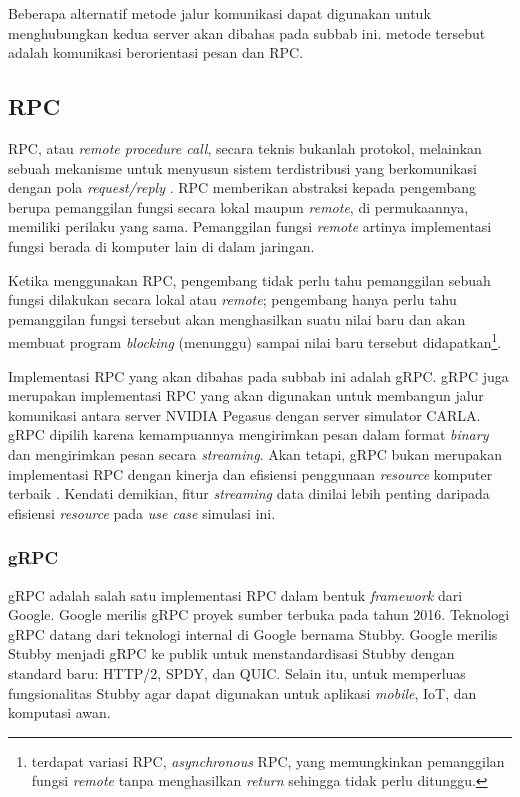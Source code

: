 Beberapa alternatif metode jalur komunikasi dapat digunakan untuk
meng\-hu\-bung\-kan kedua server akan dibahas pada subbab ini. metode tersebut
adalah komunikasi berorientasi pesan dan RPC.

\subsection{RPC}

RPC, atau \textit{remote procedure call}, secara teknis bukanlah protokol,
melainkan sebuah mekanisme untuk menyusun sistem terdistribusi yang
berkomunikasi dengan pola \textit{request/reply}
\parencite{larry_computerNetwork}. RPC memberikan abstraksi kepada pengembang
berupa pemanggilan fungsi secara lokal maupun \textit{remote}, di permukaannya,
memiliki perilaku yang sama. Pemanggilan fungsi \textit{remote} artinya
implementasi fungsi berada di komputer lain di dalam jaringan.

Ketika menggunakan RPC, pengembang tidak perlu tahu pemanggilan sebuah fung\-si
dilakukan secara lokal atau \textit{remote}; pengembang hanya perlu tahu
pemanggilan fungsi tersebut akan menghasilkan suatu nilai baru dan akan membuat
program \textit{blocking} (menunggu) sampai nilai baru tersebut
didapatkan\footnote{terdapat variasi RPC, \textit{asynchronous} RPC, yang
    memungkinkan pemanggilan fungsi \textit{remote} tanpa menghasilkan
    \textit{return} sehingga tidak perlu ditunggu.}.

Implementasi RPC yang akan dibahas pada subbab ini adalah gRPC. gRPC juga
merupakan implementasi RPC yang akan digunakan untuk membangun jalur komunikasi
antara server NVIDIA Pegasus dengan server simulator CARLA. gRPC dipilih karena
kemampuannya mengirimkan pesan dalam format \textit{binary} dan mengirimkan
pesan secara \textit{streaming}. Akan tetapi, gRPC bukan merupakan implementasi
RPC dengan kinerja dan efisiensi penggunaan \textit{resource} komputer terbaik
\parencite{chris_rpc_benchmark}. Kendati demikian, fitur \textit{streaming} data
dinilai lebih penting daripada efisiensi \textit{resource} pada \textit{use
    case} simulasi ini.

\subsubsection{gRPC}

gRPC adalah salah satu implementasi RPC dalam bentuk \textit{framework} dari
Google. Google merilis gRPC proyek sumber terbuka pada tahun 2016. Teknologi
gRPC datang dari teknologi internal di Google bernama Stubby. Google merilis
Stubby menjadi gRPC ke publik untuk menstandardisasi Stubby dengan standard
baru: HTTP/2, SPDY, dan QUIC. Selain itu, untuk memperluas fungsionalitas Stubby
agar dapat digunakan untuk aplikasi \textit{mobile}, IoT, dan komputasi awan.

